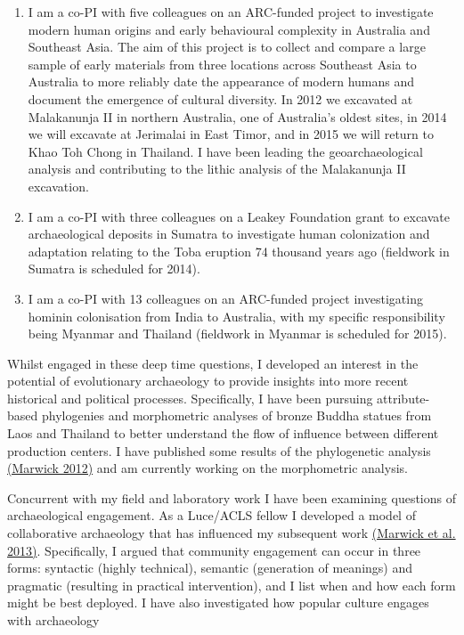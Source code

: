 \documentclass[11pt,article,oneside]{memoir}
\begin{document}
\begin{enumerate}

\item I am a co-PI with five colleagues on an ARC-funded project to investigate modern human origins and early behavioural complexity in Australia and Southeast Asia. The aim of this project is to collect and compare a large sample of early materials from three locations across Southeast Asia to Australia to more reliably date the appearance of modern humans and document the emergence of cultural diversity. In 2012 we excavated at Malakanunja II in northern Australia, one of Australia's oldest sites, in 2014 we will excavate at Jerimalai in East Timor, and in 2015 we will return to Khao Toh Chong in Thailand. I have been leading the geoarchaeological analysis and contributing to the lithic analysis of the Malakanunja II excavation. 

\item I am a co-PI with three colleagues on a Leakey Foundation grant to excavate archaeological deposits in Sumatra to investigate human colonization and adaptation relating to the Toba eruption 74 thousand years ago (fieldwork in Sumatra is scheduled for 2014). 

\item I am a co-PI with 13 colleagues on an ARC-funded project investigating hominin colonisation from India to Australia, with my specific responsibility being Myanmar and Thailand (fieldwork in Myanmar is scheduled for 2015).

\end{enumerate}

Whilst engaged in these deep time questions, I developed an interest in the potential of evolutionary archaeology to provide insights into more recent historical and political processes.  Specifically, I have been pursuing attribute-based phylogenies and morphometric analyses of bronze Buddha statues from Laos and Thailand to better understand the flow of influence between different production centers. I have published some results of the phylogenetic analysis \href{http://faculty.washington.edu/bmarwick/PDFs/Marwick_2012_Buddha_cladistics.pdf}{(Marwick 2012)} and am currently working on the morphometric analysis. 

Concurrent with my field and laboratory work I have been examining questions of archaeological engagement. As a Luce/ACLS fellow I developed a model of collaborative archaeology that has influenced my subsequent work {\href{http://faculty.washington.edu/bmarwick/PDFs/Marwick_et_al_2013_community.pdf}{(Marwick et al. 2013)}}. Specifically, I argued that community engagement can occur in three forms: syntactic (highly technical), semantic (generation of meanings) and pragmatic (resulting in practical intervention), and I list when and how each form might be best deployed. I have also investigated how popular culture engages with archaeology 
\end{document}
